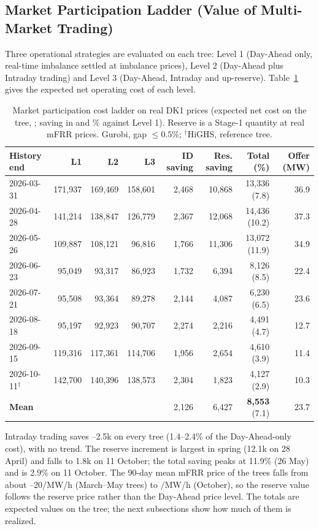 \documentclass[journal]{IEEEtran}
\begin{document}
\subsection{Market Participation Ladder (Value of Multi-Market Trading)}
Three operational strategies are evaluated on each tree: Level 1 (Day-Ahead only, real-time imbalance settled at imbalance prices), Level 2 (Day-Ahead plus Intraday trading) and Level 3 (Day-Ahead, Intraday and up-reserve). Table~\ref{tab:market_ladder} gives the expected net operating cost of each level.

\begin{table}[t]
\caption{Market participation cost ladder on real DK1 prices (expected net cost on the tree, \texteuro; saving in \texteuro{} and \% against Level 1). Reserve is a Stage-1 quantity at real mFRR prices. Gurobi, gap $\le0.5\%$; $^\dagger$HiGHS, reference tree.}
\label{tab:market_ladder}
\centering
\scriptsize
\setlength{\tabcolsep}{2.2pt}
\renewcommand{\arraystretch}{1.1}
\begin{tabular}{@{}lrrrrrrr@{}}
\toprule
\textbf{History end} & \textbf{L1} & \textbf{L2} & \textbf{L3} & \textbf{ID saving} & \textbf{Res. saving} & \textbf{Total (\%)} & \textbf{Offer (MW)} \\
\midrule
2026-03-31 & 171,937 & 169,469 & 158,601 & 2,468 & 10,868 & 13,336 (7.8) & 36.9 \\
2026-04-28 & 141,214 & 138,847 & 126,779 & 2,367 & 12,068 & 14,436 (10.2) & 37.3 \\
2026-05-26 & 109,887 & 108,121 & 96,816 & 1,766 & 11,306 & 13,072 (11.9) & 34.9 \\
2026-06-23 & 95,049 & 93,317 & 86,923 & 1,732 & 6,394 & 8,126 (8.5) & 22.4 \\
2026-07-21 & 95,508 & 93,364 & 89,278 & 2,144 & 4,087 & 6,230 (6.5) & 23.6 \\
2026-08-18 & 95,197 & 92,923 & 90,707 & 2,274 & 2,216 & 4,491 (4.7) & 12.7 \\
2026-09-15 & 119,316 & 117,361 & 114,706 & 1,956 & 2,654 & 4,610 (3.9) & 11.4 \\
2026-10-11$^\dagger$ & 142,700 & 140,396 & 138,573 & 2,304 & 1,823 & 4,127 (2.9) & 10.3 \\
\midrule
\textbf{Mean} & & & & 2,126 & 6,427 & \textbf{8,553} (7.1) & 23.7 \\
\bottomrule
\end{tabular}
\end{table}

Intraday trading saves --2.5k on every tree (1.4--2.4\% of the Day-Ahead-only cost), with no trend. The reserve increment is largest in spring (\texteuro 12.1k on 28 April) and falls to \texteuro 1.8k on 11 October; the total saving peaks at 11.9\% (26 May) and is 2.9\% on 11 October. The 90-day mean mFRR price of the trees falls from about --20/MW/h (March--May trees) to /MW/h (October), so the reserve value follows the reserve price rather than the Day-Ahead price level. The totals are expected values on the tree; the next subsections show how much of them is realized.
\end{document}

